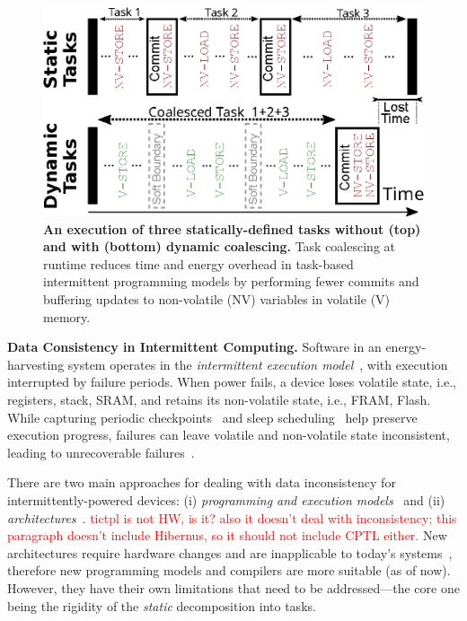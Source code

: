 \begin{figure}
	\includegraphics[width=0.95\columnwidth]{figures/coalescing-is}
    \caption{\label{fig:coalesce}\textbf{An execution of three
statically-defined tasks without (top) and with (bottom) dynamic
coalescing.} Task coalescing at runtime reduces time and energy overhead in
task-based intermittent programming models by performing fewer commits and
buffering updates to non-volatile (NV) variables in volatile (V) memory.}
\end{figure}

\textbf{Data Consistency in Intermittent Computing.} Software in an energy-harvesting system operates in the {\em intermittent execution model}~\citep{dino,lucia_snapl_2017}, with execution interrupted by failure periods. When power fails, a device loses volatile state, i.e., registers, stack, SRAM, and retains its non-volatile state, i.e., FRAM, Flash. While capturing periodic checkpoints~\citep{mementos,quickrecall} and sleep scheduling~\citep{dewdrop,hibernus,hibernusplusplus} help preserve execution progress, failures can leave volatile and non-volatile state inconsistent, leading to unrecoverable failures~\citep{dino,edb}. 

There are two main approaches for dealing with data inconsistency for intermittently-powered devices: (i) \emph{programming and execution models}~\citep{dino,ratchet,chain,alpaca} and (ii) \emph{architectures}~\citep{hicks_isca_2017,idetic,nvp,tictpl}. \textcolor{red}{tictpl is not HW, is it? also it doesn't deal with inconsistency; this paragraph doesn't include Hibernus, so it should not include CPTL either.} New architectures require hardware changes and are inapplicable to today's systems~\citep{hicks_isca_2017,nvp}, therefore new programming models and compilers are more suitable (as of now). However, they have their own limitations that need to be addressed---the core one being the rigidity of the \emph{static} decomposition into tasks.

